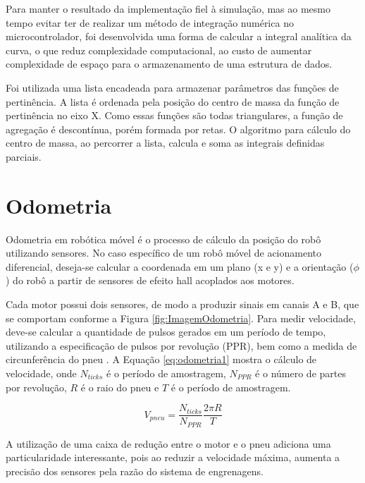 	Para manter o resultado da implementação fiel à simulação, mas ao mesmo tempo evitar ter 
	de realizar um método de integração numérica no microcontrolador, foi desenvolvida uma forma
	de calcular a integral analítica da curva, o que reduz complexidade computacional, ao custo
	de aumentar complexidade de espaço para o armazenamento de uma estrutura de dados. 
	
	Foi utilizada uma lista encadeada para armazenar parâmetros das funções de pertinência. 
	A lista é ordenada pela posição do centro de massa da função de pertinência no eixo X. Como 
	essas funções são todas triangulares, a função de agregação é descontínua, porém formada por 
	retas. O algoritmo para cálculo do centro de massa, ao percorrer a lista, calcula e soma 
	as integrais definidas parciais. 
	
\section{Odometria \label{SEC:ODOMETRIA}}

Odometria em robótica móvel é o processo de cálculo da posição do robô
utilizando sensores. No caso específico de um robô móvel de acionamento
diferencial, deseja-se calcular a coordenada em um plano (x e y) e a 
orientação ($\phi$) do robô a partir de sensores de efeito hall acoplados
aos motores. \cite{art:odometria1}

Cada motor possui dois sensores, de modo a produzir sinais em canais 
A e B, que se comportam conforme a Figura \ref{fig:ImagemOdometria}. Para medir velocidade, 
deve-se  calcular a quantidade de pulsos gerados em um período de tempo,
utilizando a especificação de pulsos por revolução (PPR), bem como a
medida de circunferência do pneu \cite{odometria2}. A Equação 
\ref{eq:odometria1} mostra o cálculo de velocidade, onde $N_{ticks}$
é o período de amostragem, $N_{PPR}$ é o número de partes por revolução,
$R$ é o raio do pneu e $T$ é o período de amostragem.



\begin{equation}
	\label{eq:odometria1}
	V_{pneu} = \frac{N_{ticks}}{N_{PPR}} \frac{2\pi R}{T}
\end{equation}

A utilização de uma caixa de redução entre o motor e o pneu adiciona
uma particularidade interessante, pois ao reduzir a velocidade
máxima, aumenta a precisão dos sensores pela razão do sistema de 
engrenagens. 
	
